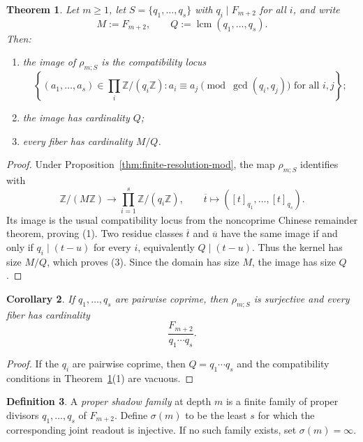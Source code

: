 \documentclass[11pt,letterpaper]{article}
\numberwithin{equation}{section}
\theoremstyle{plain}
\newtheorem{theorem}{Theorem}[section]
\newtheorem{corollary}[theorem]{Corollary}
\theoremstyle{definition}
\newtheorem{definition}[theorem]{Definition}
\theoremstyle{remark}
\newcommand{\ZZ}{\mathbb{Z}}
\DeclareMathOperator{\lcmop}{lcm}
\begin{document}
\begin{theorem}
\label{thm:finite-signature-joint-readout-image-fiber}
Let $m\ge 1$, let $S=\{q_1,\dots,q_s\}$ with $q_i\mid F_{m+2}$ for all $i$, and
write
\[
M:=F_{m+2},
\qquad
Q:=\lcmop(q_1,\dots,q_s).
\]
Then:
\begin{enumerate}[label=(\arabic*)]
\item the image of $\rho_{m;S}$ is the compatibility locus
\[
\left\{(a_1,\dots,a_s)\in\prod_i \ZZ/(q_i\ZZ):
a_i\equiv a_j\pmod{\gcd(q_i,q_j)}\text{ for all }i,j\right\};
\]
\item the image has cardinality $Q$;
\item every fiber has cardinality $M/Q$.
\end{enumerate}
\end{theorem}

\begin{proof}
Under Proposition~\ref{thm:finite-resolution-mod}, the map $\rho_{m;S}$
identifies with
\[
\ZZ/(M\ZZ)\longrightarrow \prod_{i=1}^s \ZZ/(q_i\ZZ),
\qquad
\overline{t}\longmapsto ([t]_{q_1},\dots,[t]_{q_s}).
\]
Its image is the usual compatibility locus from the noncoprime Chinese
remainder theorem, proving (1). Two residue classes $\overline{t}$ and
$\overline{u}$ have the same image if and only if $q_i\mid (t-u)$ for every
$i$, equivalently $Q\mid (t-u)$. Thus the kernel has size $M/Q$, which proves
(3). Since the domain has size $M$, the image has size $Q$.
\end{proof}

\begin{corollary}
\label{cor:joint-readout-pairwise-coprime}
If $q_1,\dots,q_s$ are pairwise coprime, then $\rho_{m;S}$ is surjective and
every fiber has cardinality
\[
\frac{F_{m+2}}{q_1\cdots q_s}.
\]
\end{corollary}

\begin{proof}
If the $q_i$ are pairwise coprime, then $Q=q_1\cdots q_s$ and the compatibility
conditions in Theorem~\ref{thm:finite-signature-joint-readout-image-fiber}(1)
are vacuous.
\end{proof}

\begin{definition}
\label{def:proper-shadow-complexity}
A \emph{proper shadow family} at depth $m$ is a finite family of proper
divisors $q_1,\dots,q_s$ of $F_{m+2}$. Define $\sigma(m)$ to be the least $s$
for which the corresponding joint readout is injective. If no such family
exists, set $\sigma(m)=\infty$.
\end{definition}
\end{document}
